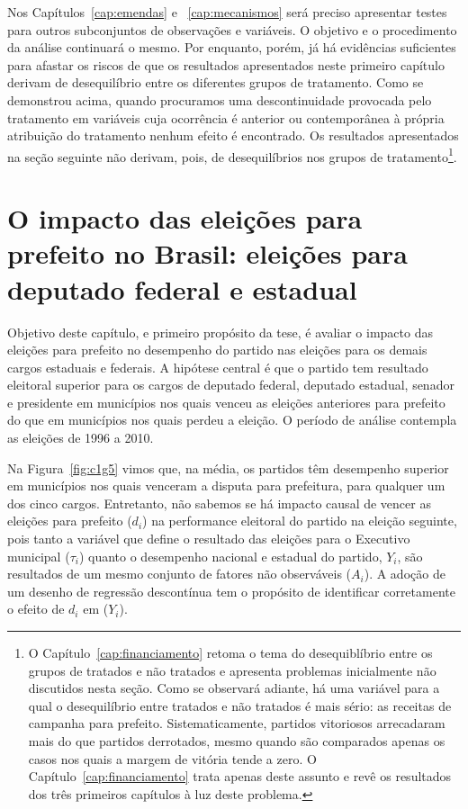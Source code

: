 Nos Capítulos~\ref{cap:emendas} e ~\ref{cap:mecanismos} será preciso apresentar testes para outros subconjuntos de observações e variáveis. O objetivo e o procedimento da análise continuará o mesmo. Por enquanto, porém, já há evidências suficientes para afastar os riscos de que os resultados apresentados neste primeiro capítulo derivam de desequilíbrio entre os diferentes grupos de tratamento. Como se demonstrou acima, quando procuramos uma descontinuidade provocada pelo tratamento em variáveis cuja ocorrência é anterior ou contemporânea à própria atribuição do tratamento nenhum efeito é encontrado. Os resultados apresentados na seção seguinte não derivam, pois, de desequilíbrios nos grupos de tratamento\footnote{O Capítulo~\ref{cap:financiamento} retoma o tema do desequiblíbrio entre os grupos de tratados e não tratados e apresenta problemas inicialmente não discutidos nesta seção. Como se observará adiante, há uma variável para a qual o desequilíbrio entre tratados e não tratados é mais sério: as receitas de campanha para prefeito. Sistematicamente, partidos vitoriosos arrecadaram mais do que partidos derrotados, mesmo quando são comparados apenas os casos nos quais a margem de vitória tende a zero. O Capítulo~\ref{cap:financiamento} trata apenas deste assunto e revê os resultados dos três primeiros capítulos à luz deste problema.}.

\section{O impacto das eleições para prefeito no Brasil: eleições para deputado federal e estadual}

Objetivo deste capítulo, e primeiro propósito da tese, é avaliar o impacto das eleições para prefeito no desempenho do partido nas eleições para os demais cargos estaduais e federais. A hipótese central é que o partido tem resultado eleitoral superior para os cargos de deputado federal, deputado estadual, senador e presidente em municípios nos quais venceu as eleições anteriores para prefeito do que em municípios nos quais perdeu a eleição. O período de análise contempla as eleições de 1996 a 2010.

Na Figura~\ref{fig:c1g5} vimos que, na média, os partidos têm desempenho superior em municípios nos quais venceram a disputa para prefeitura, para qualquer um dos cinco cargos. Entretanto, não sabemos se há impacto causal de vencer as eleições para prefeito ($d_{i}$) na performance eleitoral do partido na eleição seguinte, pois tanto a variável que define o resultado das eleições para o Executivo municipal ($\tau_{i}$) quanto o desempenho nacional e estadual do partido, $Y_{i}$, são resultados de um mesmo conjunto de fatores não observáveis ($A_{i}$). A adoção de um desenho de regressão descontínua tem o propósito de identificar corretamente o efeito de $d_{i}$ em ($Y_{i}$).

